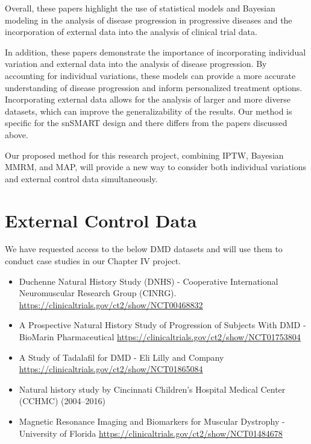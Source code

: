 Overall, these papers highlight the use of statistical models and Bayesian modeling in the analysis of disease progression in progressive diseases and the incorporation of external data into the analysis of clinical trial data. 

In addition, these papers demonstrate the importance of incorporating individual variation and external data into the analysis of disease progression. By accounting for individual variations, these models can provide a more accurate understanding of disease progression and inform personalized treatment options. Incorporating external data allows for the analysis of larger and more diverse datasets, which can improve the generalizability of the results. Our method is specific for the snSMART design and there differs from the papers discussed above. 

Our proposed method for this research project, combining IPTW, Bayesian MMRM, and MAP, will provide a new way to consider both individual variations and external control data simultaneously. 

\section{External Control Data}
We have requested access to the below DMD datasets and will use them to conduct case studies in our Chapter IV project.
\begin{itemize}
    \item Duchenne Natural History Study (DNHS) - Cooperative International Neuromuscular Research Group (CINRG). \url{https://clinicaltrials.gov/ct2/show/NCT00468832}
    \item A Prospective Natural History Study of Progression of Subjects With DMD - BioMarin Pharmaceutical \url{https://clinicaltrials.gov/ct2/show/NCT01753804}
    \item A Study of Tadalafil for DMD - Eli Lilly and Company \url{https://clinicaltrials.gov/ct2/show/NCT01865084}
    \item Natural history study by Cincinnati Children's Hospital Medical Center (CCHMC) (2004–2016)
    \item Magnetic Resonance Imaging and Biomarkers for Muscular Dystrophy - University of Florida \url{https://clinicaltrials.gov/ct2/show/NCT01484678}
\end{itemize}